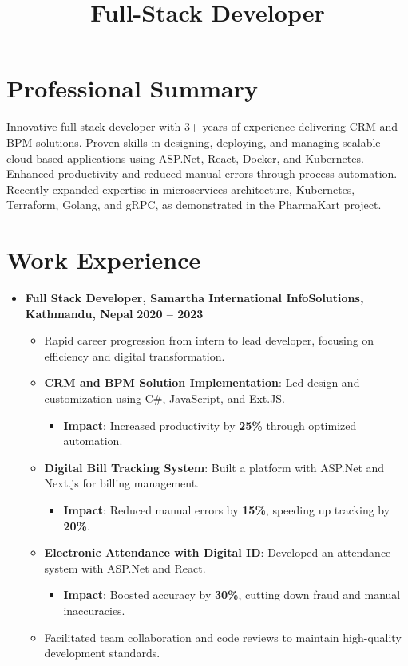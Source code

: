 \documentclass[11pt,a4paper,sans]{moderncv}
\title{Full-Stack Developer}
\newcommand{\sectionseparator}{\vspace{5pt}\par\noindent\makebox[\linewidth]{\rule{\textwidth}{0.4pt}}\vspace{0pt}}
\begin{document}
\makecvtitle

\section{Professional Summary}
Innovative full-stack developer with 3+ years of experience delivering CRM and BPM solutions. Proven skills in designing, deploying, and managing scalable cloud-based applications using ASP.Net, React, Docker, and Kubernetes. Enhanced productivity and reduced manual errors through process automation. Recently expanded expertise in microservices architecture, Kubernetes, Terraform, Golang, and gRPC, as demonstrated in the PharmaKart project.

\sectionseparator

\section{Work Experience}
\begin{itemize}[leftmargin=*]
    \item \textbf{Full Stack Developer, Samartha International InfoSolutions, Kathmandu, Nepal} 
    \hfill \textbf{2020 -- 2023}
    \begin{itemize}
        \item Rapid career progression from intern to lead developer, focusing on efficiency and digital transformation.
        \item \textbf{CRM and BPM Solution Implementation}: Led design and customization using C\#, JavaScript, and Ext.JS.
        \begin{itemize}
            \item \textbf{Impact}: Increased productivity by \textbf{25\%} through optimized automation.
        \end{itemize}
        \item \textbf{Digital Bill Tracking System}: Built a platform with ASP.Net and Next.js for billing management.
        \begin{itemize}
            \item \textbf{Impact}: Reduced manual errors by \textbf{15\%}, speeding up tracking by \textbf{20\%}.
        \end{itemize}
        \item \textbf{Electronic Attendance with Digital ID}: Developed an attendance system with ASP.Net and React.
        \begin{itemize}
            \item \textbf{Impact}: Boosted accuracy by \textbf{30\%}, cutting down fraud and manual inaccuracies.
        \end{itemize}
        \item Facilitated team collaboration and code reviews to maintain high-quality development standards.
    \end{itemize}
\end{itemize}
\end{document}
